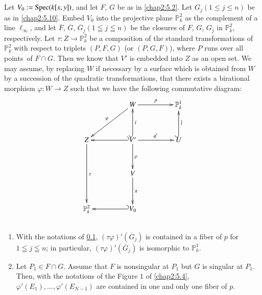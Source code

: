 \subsection{}\label{chap2:5.19}
Let $V_{0}:=\operatorname{Spec}(k[x,y])$, and let $F$, $G$ be as in \ref{chap2:5.2}. Let
$G_{j}(1\leq j\leq n)$ be as in \ref{chap2:5.10}. Embed $V_{0}$ into the
projective plane $\mathbb{P}^{2}_{k}$ as the complement of a line
$\ell_{\infty}$, and let $\overline{F}$, $\overline{G}$,
$\overline{G}_{j}(1\leqq j\leqq n)$ be the closures of $F$, $G$,
$G_{j}$ in $\mathbb{P}^{2}_{k}$, respectively. Let $\tau:Z\to
\mathbb{P}^{2}_{k}$ be a composition of the standard transformations
of $\mathbb{P}^{2}_{k}$ with respect to triplets $(P,F,G)$ (or
$(P,G,F)$), where $P$ runs over all points\pageoriginale\ of $F\cap
G$. Then we know that $V'$ is embedded into $Z$ as an open set. We may
assume, by replacing $W$ if necessary by a surface which is obtained
from $W$ by a succession of the quadratic transformations, that there
exists a birational morphism $\varphi:W\to Z$ such that we have the
following commutative diagram:
\[
\xymatrix@C=1.7cm@R=1.2cm{
 & W\ar[dl]_{\varphi}\ar[r]^{p} & \mathbb{P}^{1}_{k}\\
Z\ar[dd]^{\tau} & V'\ar@{_{(}->}[l]\ar[r]^{q'}\ar[d]^{\rho}
  \ar@{^{(}->}[u]_{l} & U\ar@{^{(}->}[u]_{\overline{l}}\\
 & V\ar[d]^{\pi} &\\
\mathbb{P}^{2}_{k} & V_{0}\ar@{_{(}->}[l] &
}
\]

\subsection{}\label{chap2:5.20}
\begin{lemma*}
\begin{enumerate}
\renewcommand{\labelenumi}{\rm(\theenumi)}
\item With the notations of \ref{chap2:5.19},
  $(\tau\varphi)'(\overline{G}_{j})$ is contained in a fiber of $p$
  for $1\leqq j\leqq n$; in particular,
  $(\tau\varphi)'(\overline{G}_{j})$ is isomorphic to
  $\mathbb{P}^{1}_{k}$.

\item Let $P_{1}\in F\cap G$. Assume that $F$ is nonsingular at
  $P_{1}$ but $G$ is singular at $P_{1}$. Then, with the notations of
  the Figure $1$ of \ref{chap2:5.4},
  $\varphi'(E_{1}),\ldots,\varphi'(E_{N-1})$ are contained in one and
  only one fiber of $p$.
\end{enumerate}
\end{lemma*}

